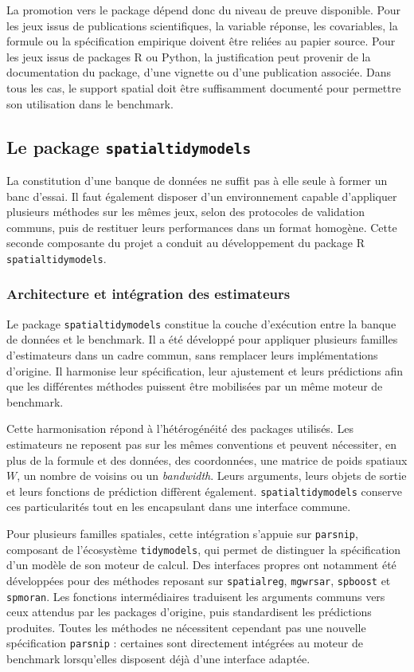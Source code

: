 \documentclass[11pt,a4paper]{article}
\begin{document}
La promotion vers le package dépend donc du niveau de preuve disponible. Pour les jeux issus de publications scientifiques, la variable réponse, les covariables, la formule ou la spécification empirique doivent être reliées au papier source. Pour les jeux issus de packages R ou Python, la justification peut provenir de la documentation du package, d'une vignette ou d'une publication associée. Dans tous les cas, le support spatial doit être suffisamment documenté pour permettre son utilisation dans le benchmark.

\subsection{Le package \texttt{spatialtidymodels}}

La constitution d'une banque de données ne suffit pas à elle seule à former un banc d'essai. Il faut également disposer d'un environnement capable d'appliquer plusieurs méthodes sur les mêmes jeux, selon des protocoles de validation communs, puis de restituer leurs performances dans un format homogène. Cette seconde composante du projet a conduit au développement du package R \texttt{spatialtidymodels}.

\subsubsection{Architecture et intégration des estimateurs}

Le package \texttt{spatialtidymodels} constitue la couche d'exécution entre la banque de données et le benchmark. Il a été développé pour appliquer plusieurs familles d'estimateurs dans un cadre commun, sans remplacer leurs implémentations d'origine. Il harmonise leur spécification, leur ajustement et leurs prédictions afin que les différentes méthodes puissent être mobilisées par un même moteur de benchmark.

Cette harmonisation répond à l'hétérogénéité des packages utilisés. Les estimateurs ne reposent pas sur les mêmes conventions et peuvent nécessiter, en plus de la formule et des données, des coordonnées, une matrice de poids spatiaux $W$, un nombre de voisins ou un \textit{bandwidth}. Leurs arguments, leurs objets de sortie et leurs fonctions de prédiction diffèrent également. \texttt{spatialtidymodels} conserve ces particularités tout en les encapsulant dans une interface commune.

Pour plusieurs familles spatiales, cette intégration s'appuie sur \texttt{parsnip}, composant de l'écosystème \texttt{tidymodels}, qui permet de distinguer la spécification d'un modèle de son moteur de calcul. Des interfaces propres ont notamment été développées pour des méthodes reposant sur \texttt{spatialreg}, \texttt{mgwrsar}, \texttt{spboost} et \texttt{spmoran}. Les fonctions intermédiaires traduisent les arguments communs vers ceux attendus par les packages d'origine, puis standardisent les prédictions produites. Toutes les méthodes ne nécessitent cependant pas une nouvelle spécification \texttt{parsnip} : certaines sont directement intégrées au moteur de benchmark lorsqu'elles disposent déjà d'une interface adaptée.
\end{document}
